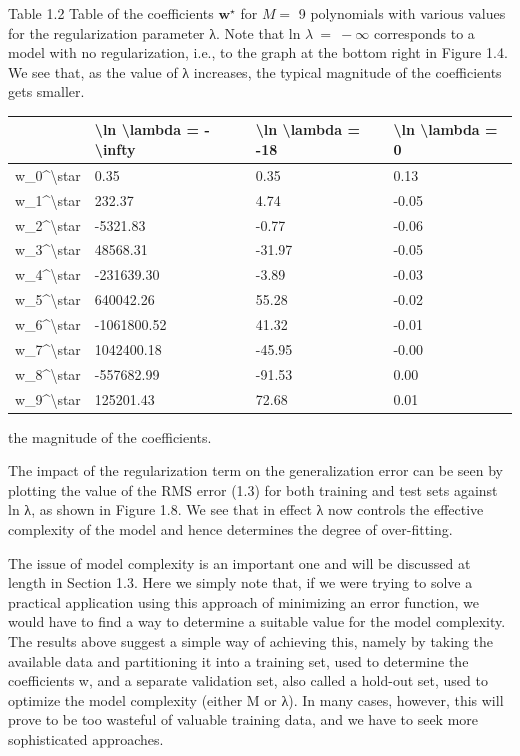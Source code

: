 \documentclass[
  10
]{article}
\newcounter{none} %
\begin{document}
Table 1.2 Table of the coefficients \(\mathbf { w } ^ { \star }\) for
\(M =\) 9 polynomials with various values for the regularization
parameter λ. Note that ln \(\lambda \ = \ - \infty\) corresponds to a
model with no regularization, i.e., to the graph at the bottom right in
Figure 1.4. We see that, as the value of λ increases, the typical
magnitude of the coefficients gets smaller.

{\def\LTcaptype{none} %
\begin{longtable}[]{@{}|l|l|l|l|@{}}
\toprule\noalign{}
\endhead
\bottomrule\noalign{}
\endlastfoot
\hline
& \textbackslash ln \textbackslash lambda = -\textbackslash infty &
\textbackslash ln \textbackslash lambda = -18 & \textbackslash ln
\textbackslash lambda = 0 \\
\hline
w\_0\^{}\textbackslash star & 0.35 & 0.35 & 0.13 \\
\hline
w\_1\^{}\textbackslash star & 232.37 & 4.74 & -0.05 \\
\hline
w\_2\^{}\textbackslash star & -5321.83 & -0.77 & -0.06 \\
\hline
w\_3\^{}\textbackslash star & 48568.31 & -31.97 & -0.05 \\
\hline
w\_4\^{}\textbackslash star & -231639.30 & -3.89 & -0.03 \\
\hline
w\_5\^{}\textbackslash star & 640042.26 & 55.28 & -0.02 \\
\hline
w\_6\^{}\textbackslash star & -1061800.52 & 41.32 & -0.01 \\
\hline
w\_7\^{}\textbackslash star & 1042400.18 & -45.95 & -0.00 \\
\hline
w\_8\^{}\textbackslash star & -557682.99 & -91.53 & 0.00 \\
\hline
w\_9\^{}\textbackslash star & 125201.43 & 72.68 & 0.01 \\
\hline
\end{longtable}
}

the magnitude of the coefficients.

The impact of the regularization term on the generalization error can be
seen by plotting the value of the RMS error (1.3) for both training and
test sets against ln λ, as shown in Figure 1.8. We see that in effect λ
now controls the effective complexity of the model and hence determines
the degree of over-fitting.

The issue of model complexity is an important one and will be discussed
at length in Section 1.3. Here we simply note that, if we were trying to
solve a practical application using this approach of minimizing an error
function, we would have to find a way to determine a suitable value for
the model complexity. The results above suggest a simple way of
achieving this, namely by taking the available data and partitioning it
into a training set, used to determine the coefficients w, and a
separate validation set, also called a hold-out set, used to optimize
the model complexity (either M or λ). In many cases, however, this will
prove to be too wasteful of valuable training data, and we have to seek
more sophisticated approaches.
\end{document}
